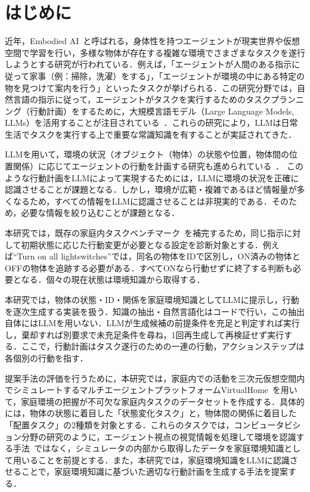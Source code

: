 \section{はじめに} \label{sec1}

近年，Embodied AI~\cite{duan2022}と呼ばれる，身体性を持つエージェントが現実世界や仮想空間で学習を行い，多様な物体が存在する複雑な環境でさまざまなタスクを遂行しようとする研究が行われている．例えば，「エージェントが人間のある指示に従って家事（例：掃除，洗濯）をする」，「エージェントが環境の中にある特定の物を見つけて案内を行う」といったタスクが挙げられる．この研究分野では，自然言語の指示に従って，エージェントがタスクを実行するためのタスクプランニング（行動計画）をするために，大規模言語モデル（Large Language Models, LLMs）を活用することが注目されている~\cite{huang22,rana2023sayplan,song2023llm}．これらの研究により，LLMは日常生活でタスクを実行する上で重要な常識知識を有することが実証されてきた．

LLMを用いて，環境の状況（オブジェクト（物体）の状態や位置，物体間の位置関係）に応じてエージェントの行動を計画する研究も進められている~\cite{lin2023grounded}．
このような行動計画をLLMによって実現するためには，LLMに環境の状況を正確に認識させることが課題となる．しかし，環境が広範・複雑であるほど情報量が多くなるため，すべての情報をLLMに認識させることは非現実的である．そのため，必要な情報を絞り込むことが課題となる．

本研究では，既存の家庭内タスクベンチマーク~\cite{Puig_2018_CVPR,ALFRED20}を補完するため，同じ指示に対して初期状態に応じた行動変更が必要となる設定を診断対象とする．例えば``Turn on all lightswitches''では，同名の物体をIDで区別し，ON済みの物体とOFFの物体を追跡する必要がある．すべてONなら行動せずに終了する判断も必要となる．個々の現在状態は環境知識から取得する．

本研究では，物体の状態・ID・関係を家庭環境知識としてLLMに提示し，行動を逐次生成する実装を扱う．知識の抽出・自然言語化はコードで行い，この抽出自体にはLLMを用いない．LLMが生成候補の前提条件を充足と判定すれば実行し，棄却すれば別要求で未充足条件を尋ね，1回再生成して再検証せず実行する．ここで，行動計画はタスク遂行のための一連の行動，アクションステップは各個別の行動を指す．

提案手法の評価を行うために，本研究では，家庭内での活動を三次元仮想空間内でシミュレートするマルチエージェントプラットフォームVirtualHome~\cite{Puig_2018_CVPR}を用いて，家庭環境の把握が不可欠な家庭内タスクのデータセットを作成する．具体的には，物体の状態に着目した「状態変化タスク」と，物体間の関係に着目した「配置タスク」の2種類を対象とする．これらのタスクでは，コンピュータビション分野の研究のように，エージェント視点の視覚情報を処理して環境を認識する手法~\cite{song2023llm,kim2023context,nakajima2024combining}ではなく，シミュレータの内部から取得したデータを家庭環境知識として用いることを前提とする．また，本研究では，家庭環境知識をLLMに認識させることで，家庭環境知識に基づいた適切な行動計画を生成する手法を提案する．

